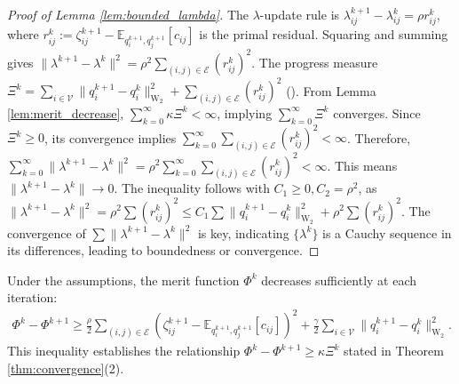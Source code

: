 \begin{proof}[Proof of Lemma \ref{lem:bounded_lambda}]
The $\lambda$-update rule  is $\lambda_{ij}^{k+1} - \lambda_{ij}^{k} = \rho r_{ij}^k$, where $r_{ij}^k := \zeta_{ij}^{k+1} - \mathbb{E}_{q_i^{k+1}, q_j^{k+1}}[c_{ij}]$ is the primal residual.
Squaring and summing gives $\|\lambda^{k+1} - \lambda^k\|^2 = \rho^2 \sum_{(i,j) \in {\mathcal{E}}} (r_{ij}^k)^2$.
The progress measure $\Xi^k = \sum_{i \in {\mathcal{V}}} \|q_i^{k+1} - q_i^k\|^2_{\text{W}_2} + \sum_{(i,j) \in {\mathcal{E}}} (r_{ij}^k)^2$ ().
From Lemma \ref{lem:merit_decrease}, $\sum_{k=0}^\infty \kappa \Xi^k < \infty$, implying $\sum_{k=0}^\infty \Xi^k$ converges.
Since $\Xi^k \ge 0$, its convergence implies $\sum_{k=0}^\infty \sum_{(i,j) \in {\mathcal{E}}} (r_{ij}^k)^2 < \infty$.
Therefore, $\sum_{k=0}^\infty \|\lambda^{k+1} - \lambda^k\|^2 = \rho^2 \sum_{k=0}^\infty \sum_{(i,j) \in {\mathcal{E}}} (r_{ij}^k)^2 < \infty$.
This means $\|\lambda^{k+1} - \lambda^k\| \to 0$. The inequality  follows with $C_1 \ge 0, C_2 = \rho^2$, as $\|\lambda^{k+1} - \lambda^k\|^2 = \rho^2 \sum (r_{ij}^k)^2 \le C_1 \sum \|q_i^{k+1} - q_i^k\|^2_{\text{W}_2} + \rho^2 \sum (r_{ij}^k)^2$.
The convergence of $\sum \|\lambda^{k+1} - \lambda^k\|^2$ is key, indicating $\{\lambda^k\}$ is a Cauchy sequence in its differences, leading to boundedness or convergence.
\end{proof}

\begin{lemma}
\label{lem:merit_decrease}
Under the assumptions, the merit function $\Phi^k$ decreases sufficiently at each iteration:
\begin{equation}
\begin{aligned}
\Phi^k - \Phi^{k+1} \ge \frac{\rho}{2} \sum_{(i,j) \in {\mathcal{E}}} (\zeta_{ij}^{k+1} - \mathbb{E}_{q_i^{k+1}, q_j^{k+1}}[c_{ij}])^2 + \frac{\gamma}{2} \sum_{i \in {\mathcal{V}}} \|q_i^{k+1} - q_i^k\|^2_{\text{W}_2}.
\label{eq:merit_decrease_bound}
\end{aligned}
\end{equation}
This inequality establishes the relationship $\Phi^k - \Phi^{k+1} \ge \kappa \Xi^k$ stated in Theorem \ref{thm:convergence}(2).
\end{lemma}

